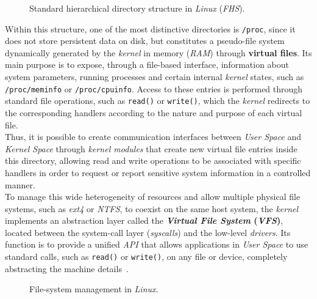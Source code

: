 \begin{figure}[H]
  \centering
  \scalebox{0.8}{}
  \caption{Standard hierarchical directory structure in \textit{Linux} (\textit{FHS}).}
  \label{fig:fhs}
\end{figure}

Within this structure, one of the most distinctive directories is \texttt{/proc}, since it does not store persistent data on disk, but constitutes a pseudo-file system dynamically generated by the \textit{kernel} in memory (\textit{RAM}) through \textbf{virtual files}.
Its main purpose is to expose, through a file-based interface, information about system parameters, running processes and certain internal \textit{kernel} states, such as \texttt{/proc/meminfo} or \texttt{/proc/cpuinfo}.
Access to these entries is performed through standard file operations, such as \texttt{read()} or \texttt{write()}, which the \textit{kernel} redirects to the corresponding handlers according to the nature and purpose of each virtual file.\\

Thus, it is possible to create communication interfaces between \textit{User Space} and \textit{Kernel Space} through \textit{kernel modules} that create new virtual file entries inside this directory,
allowing read and write operations to be associated with specific handlers in order to request or report sensitive system information in a controlled manner.\\

To manage this wide heterogeneity of resources and allow multiple physical file systems, such as \textit{ext4} or \textit{NTFS}, to coexist on the same host system, the \textit{kernel} implements an abstraction layer called the \textbf{\textit{Virtual File System} (\textit{VFS})},
located between the system-call layer (\textit{syscalls}) and the low-level \textit{drivers}.
Its function is to provide a unified \textit{API} that allows applications in \textit{User Space} to use standard calls, such as \texttt{read()} or \texttt{write()}, on any file or device, completely abstracting the machine details~\cite{librossoo}.\\

\begin{figure}[h!]
  \centering
  \scalebox{0.8}{}
  \caption{File-system management in \textit{Linux}.}
  \label{fig:vfs}
\end{figure}

